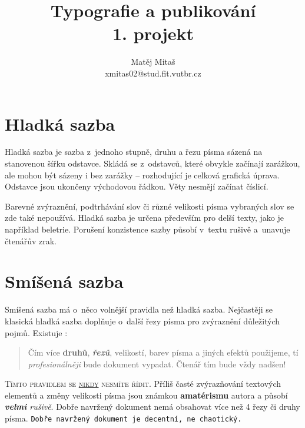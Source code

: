 \documentclass[11pt]{article}
\begin{document}
	\title{Typografie a publikování \\ 1. projekt}
	\author{Matěj Mitaš \\ xmitas02@stud.fit.vutbr.cz \\}
	\date{}

	\maketitle

	\begin{multicols*}{2}
		\section{Hladká sazba}

			Hladká sazba je sazba z~jednoho stupně, druhu a řezu pí­sma sázená na stanovenou
			šířku odstavce. Skládá se z~odstavců, které obvykle začínají­
			zarážkou, ale mohou být sázeny i bez zarážky – rozhodují­cí­ je celková grafická
			úprava. Odstavce jsou ukončeny východovou řádkou. Věty nesmějí
			začínat číslicí.

			Barevné zvýraznění­, podtrhávání­ slov či různé velikosti písma vybraných slov se zde
			také nepoužívá. Hladká sazba je určena především pro delší­ texty, jako je napří­klad
			beletrie. Porušení­ konzistence sazby působí v~textu rušivě a~unavuje čtenářův zrak.

		\section{Smíšená sazba}

			Smíšená sazba má o~něco volnější­ pravidla než hladká sazba. Nejčastěji se klasická
			hladká sazba doplňuje o~další řezy pí­sma pro zvýraznění­
			důležitých pojmů. Existuje :

			\begin{quote}
				\hspace{5mm} Čí­m ví­ce \textbf{druhů}, \textbf{\textit{řezů}}, {\tiny
				velikostí}, barev pí­sma a jiných efektů použijeme, tí­ \textit{profesionálněji} bude
				dokument vypadat. Čtenář tím bude vždy {\Huge nadšen!}\hspace{10mm}
			\end{quote}


			\textsc{Tí­mto pravidlem se \underline{nikdy} nesmí­te ří­dit.} Příliš časté zvýrazňování
			textových elementů  a změny velikosti {\tiny pí­sma} jsou {\huge známkou} \textbf{\Huge
			amatérismu} autora a působí­ \textit{\textbf{velmi} rušivě}. Dobře navržený dokument nemá
			obsahovat ví­ce než 4 řezy či druhy pí­sma. \texttt{Dobře navržený dokument je decentní­, ne
			chaotický.}


\end{multicols*}
\end{document}
